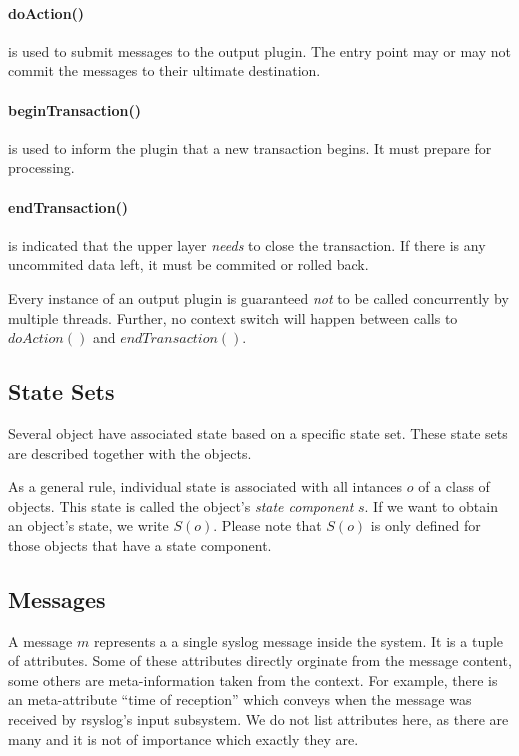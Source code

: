 \documentclass[a4paper,10pt]{article}
\begin{document}
\paragraph{doAction()}
is used to submit messages to the output plugin. The entry point may or may not commit the messages to their ultimate destination.

\paragraph{beginTransaction()}
is used to inform the plugin that a new transaction begins. It must prepare for processing.

\paragraph{endTransaction()}
is indicated that the upper layer \emph{needs} to close the transaction. If there is any uncommited data left, it must be commited or rolled back.

Every instance of an output plugin is guaranteed \emph{not} to be called concurrently by multiple threads. Further, no context switch will happen between calls to $doAction()$ and $endTransaction()$.

\subsection{State Sets}
Several object have associated state based on a specific state set. These state sets are described together with the objects.

As a general rule, individual state is associated with all intances $o$ of a class of objects. This state is called the object's  \emph{state component} $s$. If we want to obtain an object's state, we write $S(o)$. Please note that $S(o)$ is only defined for those objects that have a state component.

\subsection{Messages} 
A message $m$ represents a a single syslog message inside the system. It is a tuple of attributes. Some of these attributes directly orginate from the message content, some others are meta-information taken from the context. For example, there is an meta-attribute ``time of reception'' which conveys when the message was received by rsyslog's input subsystem. We do not list attributes here, as there are many and it is not of importance which exactly they are.
\end{document}
